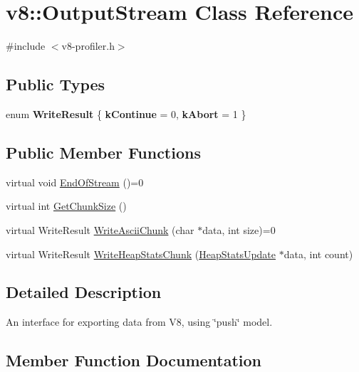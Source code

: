 \hypertarget{classv8_1_1OutputStream}{}\section{v8\+:\+:Output\+Stream Class Reference}
\label{classv8_1_1OutputStream}


{\ttfamily \#include $<$v8-\/profiler.\+h$>$}

\subsection*{Public Types}
\begin{DoxyCompactItemize}
\item 
\mbox{\label{classv8_1_1OutputStream_a336c7605a0ce4fbe6f6fca3b03bc16de}} 
enum {\bfseries Write\+Result} \{ {\bfseries k\+Continue} = 0, 
{\bfseries k\+Abort} = 1
 \}
\end{DoxyCompactItemize}
\subsection*{Public Member Functions}
\begin{DoxyCompactItemize}
\item 
virtual void \mbox{\hyperlink{classv8_1_1OutputStream_a6c5c308367fc5776bcbedff0e94d6049}{End\+Of\+Stream}} ()=0
\item 
virtual int \mbox{\hyperlink{classv8_1_1OutputStream_a93bdaa790cbd66a7283fad2cca3f48f7}{Get\+Chunk\+Size}} ()
\item 
virtual Write\+Result \mbox{\hyperlink{classv8_1_1OutputStream_a42adc62ebe43d00159f80328538f217f}{Write\+Ascii\+Chunk}} (char $\ast$data, int size)=0
\item 
virtual Write\+Result \mbox{\hyperlink{classv8_1_1OutputStream_a104fd1a0b5ef685e1d4967aaacbb9e9d}{Write\+Heap\+Stats\+Chunk}} (\mbox{\hyperlink{structv8_1_1HeapStatsUpdate}{Heap\+Stats\+Update}} $\ast$data, int count)
\end{DoxyCompactItemize}


\subsection{Detailed Description}
An interface for exporting data from V8, using \char`\"{}push\char`\"{} model. 

\subsection{Member Function Documentation}
\mbox{\label{classv8_1_1OutputStream_a6c5c308367fc5776bcbedff0e94d6049}} 
